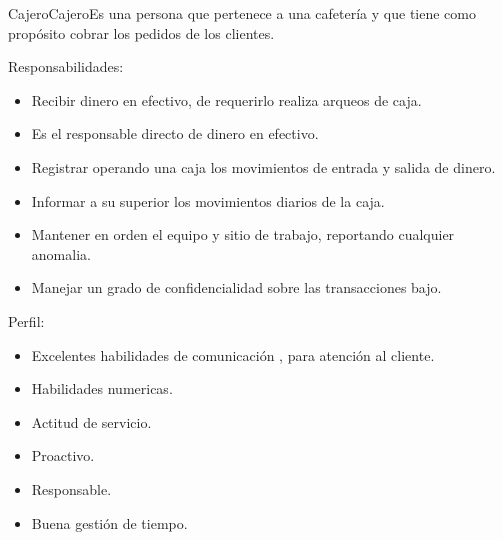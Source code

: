 \begin{Actor}{Cajero}{Cajero}{Es una persona que pertenece a una cafetería y que tiene como propósito cobrar los pedidos de los clientes.}
\item[Responsabilidades:] \hspace{0.5cm}
		\begin{itemize}
			\item Recibir dinero en efectivo, de requerirlo realiza arqueos de caja.
			
			\item Es el responsable directo de dinero en efectivo.
			
			\item Registrar operando una caja los movimientos de entrada y salida de dinero.
			
			\item Informar a su superior los movimientos diarios de la caja.
			
			\item Mantener en orden el equipo y sitio de trabajo, reportando cualquier anomalia.
			
			\item Manejar un grado de confidencialidad sobre las transacciones bajo.
		\end{itemize}
	
	\item[Perfil:] \hspace{0.5cm}
		\begin{itemize}
			\item Excelentes habilidades de comunicación , para atención al cliente.
			
			\item Habilidades numericas.
			
			\item Actitud de servicio.
			
			\item Proactivo.
			
			\item Responsable.
			
			\item Buena gestión de tiempo.
		\end{itemize}

\end{Actor}




